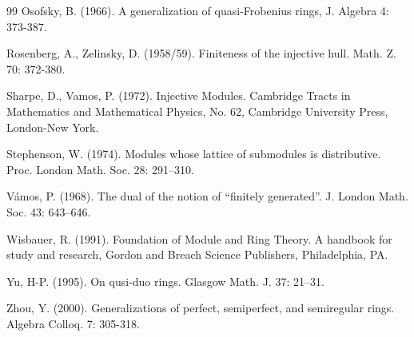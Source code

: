 \documentclass{amsart}
\theoremstyle{plain}
\numberwithin{equation}{section}
\begin{document}
\begin{thebibliography}{99}
Osofsky, B. (1966). A generalization of quasi-Frobenius rings, J. Algebra 4: 373-387. 

Rosenberg, A., Zelinsky, D. (1958/59). Finiteness of the injective hull. Math. Z. 70: 372-380. 

Sharpe, D., Vamos, P. (1972). Injective Modules. Cambridge Tracts in Mathematics and Mathematical Physics, No. 62, Cambridge University Press, London-New
York. 

 Stephenson, W. (1974). Modules whose lattice of submodules is distributive.
Proc. London Math. Soc. 28: 291--310. 

 V{\'a}mos, P. (1968). The dual of the
notion of ``finitely generated''. J. London Math. Soc. 43: 643--646. 

 Wisbauer,
R. (1991). Foundation of Module and Ring Theory. A handbook for study and research, Gordon and Breach Science Publishers, Philadelphia, PA. 

Yu, H-P. (1995). On qusi-duo rings. Glasgow Math. J. 37: 21--31. 

 Zhou, Y. (2000).
Generalizations of perfect, semiperfect, and semiregular rings. Algebra Colloq. 7: 305-318.
\end{thebibliography}
\end{document}
